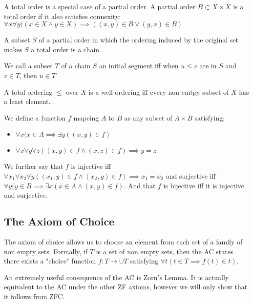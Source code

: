 \documentclass[]{article}
\begin{document}
\begin{defi} 
		A total order is a special case of a partial order. A partial order $B \subset X\times X$ is a total order if it also satisfies connexity: $\forall x \forall y((x \in X \land y \in X) \implies ((x,y) \in B \lor (y,x) \in B)$

		A subset $S$ of a partial order in which the ordering induced by the original set makes $S$ a total order is a chain.

		We call a subset $T$ of a chain $S$ an initial segment iff when $u \leq v$ are in $S$ and $v \in T$, then $u \in T$
\end{defi}

\begin{defi} 
	A total ordering $\leq$ over $X$ is a well-ordering iff every non-emtpy subset of $X$ has a least element.
\end{defi}

\begin{defi} [Function]

		We define a function $f$ mapeing $A$ to $B$ as any subset of $A \times B$ satisfying:
		\begin{itemize}
		\item $\forall x(x \in A \implies \exists y ((x,y) \in f)$
		\item $\forall x \forall y \forall z((x, y) \in f \land (x, z) \in f) \implies y = z$	
		\end{itemize}	

		We further say that $f$ is injective iff $\forall x_1 \forall x_2 \forall y((x_1, y) \in f \land (x_2, y) \in f) \implies x_1 = x_2$ and surjective iff $\forall y (y \in B \implies \exists x (x \in A \land (x,y) \in f)$. And that  $f$ is bijective iff it is injective and surjective.
\end{defi}

\subsection{The Axiom of Choice}

The axiom of choice allows us to choose an element from each set of a family of non empty sets. Formally, if $T$ is a set of non empty sets, then the AC states there exists a "choice" function $f: T \to \cup T$ satisfying $\forall t(t \in T \implies f(t) \in t)$.

An extremely useful consequence of the AC is Zorn's Lemma. It is actually equivalent to the AC under the other ZF axioms, however we will only show that it follows from ZFC.
\end{document}
